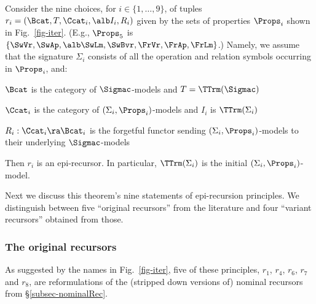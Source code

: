 \begin{thm}\rm \label{thm-allNominalRecs}
Consider the  nine choices, for $i\in\{1,\ldots,9\}$, of 
tuples $r_i = (\Bcat,T,\Ccat_i,\alb I_i,R_i)$ 
given by the sets of properties $\Props_i$ shown in  
Fig.~\ref{fig-iter}. 
(E.g., $\Props_5$ is $\{\SwVr, \SwAp, \alb\SwLm, \SwBvr, \FrVr, \FrAp, \FrLm\}$.)
Namely, 
we assume that the signature $\Sigma_i$ consists of all the 
operation and relation 
symbols 
occurring in $\Props_i$, and: 
\begin{mmyitem}
	\item $\Bcat$ is the category of $\Sigmac$-models and $T=\TTrm(\Sigmac)$
	\item $\Ccat_i$ is the category of $(\Sigma_i,\Props_i)$-models and 
	$I_i$ is $\TTrm(\Sigma_i)$
	\item $R_i : \Ccat_i \ra \Bcat_i$ is the forgetful functor sending %
	 $(\Sigma_i,\Props_i)$-models to their underlying $\Sigmac$-models
\end{mmyitem}
%
\par
Then $r_i$ is an epi-recursor. 
%
In particular, $\TTrm(\Sigma_i)$ is the initial $(\Sigma_i,\Props_i)$-model.  %
\end{thm}
%


Next we discuss this theorem's nine statements of epi-recursion principles. 
We %
distinguish between %
five ``original recursors'' from the literature and four ``variant recursors'' obtained from those. %

\subsubsection{The original recursors}  
\label{subsubsec-origRecs}

As suggested by the names in Fig.~\ref{fig-iter}, five of these principles, %
$r_1$, $r_4$, $r_6$, $r_7$ and $r_8$, are reformulations %
of %
the (stripped down versions of) %
nominal recursors %
from \S\ref{subsec-nominalRec}.  
%	
%
%

